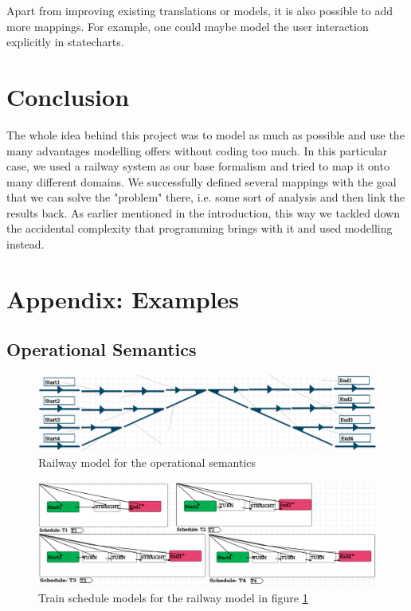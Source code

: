 \documentclass{article}
\begin{document}
Apart from improving existing translations or models, it is also possible to add more mappings. For example, one could maybe model the user interaction explicitly in statecharts.

\section{Conclusion}

The whole idea behind this project was to model as much as possible and use the many advantages modelling offers without coding too much. In this particular case, we used a railway system as our base formalism and tried to map it onto many different domains. We successfully defined several mappings with the goal that we can solve the "problem" there, i.e. some sort of analysis and then link the results back. As earlier mentioned in the introduction, this way we tackled down the accidental complexity that programming brings with it and used modelling instead.


\nocite{*}


\newpage
\section*{Appendix: Examples}
\label{appendix}

\subsection*{Operational Semantics}

\begin{figure}[H]
    \centering
    \includegraphics[width=\textwidth]{images/example_devs_railway.png}
    \caption{Railway model for the operational semantics}
    \label{example_devs_railway}
\end{figure}

\begin{figure}[H]
    \centering
    \includegraphics[width=\textwidth]{images/example_devs_schedule.png}
    \caption{Train schedule models for the railway model in figure \ref{example_devs_railway}}
    \label{example_devs_schedule}
\end{figure}
\end{document}
